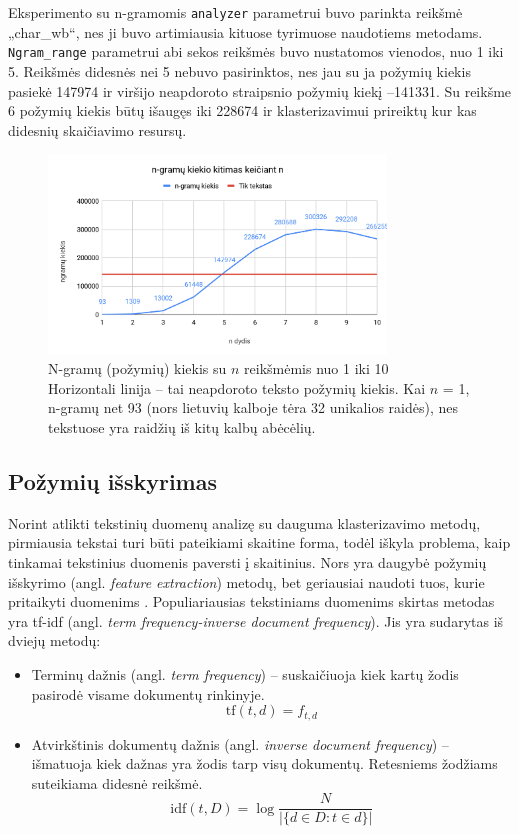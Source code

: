 \documentclass{VUMIFInfBakalaurinis}
\begin{document}
Eksperimento su n-gramomis \texttt{analyzer} parametrui buvo parinkta
reikšmė „char\_wb“, nes ji buvo artimiausia kituose tyrimuose
naudotiems metodams. \texttt{Ngram\_range} parametrui abi sekos reikšmės
buvo nustatomos vienodos, nuo 1 iki 5. Reikšmės didesnės nei 5 nebuvo
pasirinktos, nes jau su ja požymių kiekis pasiekė 147974 ir viršijo
neapdoroto straipsnio požymių kiekį --141331. Su reikšme 6 požymių
kiekis būtų išaugęs iki 228674 ir klasterizavimui prireiktų kur kas
didesnių skaičiavimo resursų.

\begin{figure}[H]
	\centering
	\includegraphics[width=0.8\textwidth]{./img/image7.png}
	\caption{N-gramų (požymių) kiekis su $n$ reikšmėmis nuo 1 iki 10\\
  Horizontali linija -- tai neapdoroto teksto požymių kiekis. Kai $n$
  = 1, n-gramų net 93 (nors lietuvių kalboje tėra 32 unikalios raidės),
  nes tekstuose yra raidžių iš kitų kalbų abėcėlių.}
  \label{nsize}
\end{figure}

\subsection{Požymių išskyrimas}\label{tfidf}

Norint atlikti tekstinių duomenų analizę su dauguma klasterizavimo
metodų, pirmiausia tekstai turi būti pateikiami skaitine forma, todėl
iškyla problema, kaip tinkamai tekstinius duomenis paversti į
skaitinius. Nors yra daugybė požymių išskyrimo (angl. \emph{feature
extraction}) metodų, bet geriausiai naudoti tuos, kurie pritaikyti
duomenims \cite{alelyani2013feature}. Populiariausias tekstiniams duomenims skirtas
metodas yra tf-idf (angl. \emph{term frequency-inverse document
frequency}). Jis yra sudarytas iš dviejų metodų:

\begin{itemize}
\item
  Terminų dažnis (angl. \emph{term frequency}) -- suskaičiuoja kiek
  kartų žodis pasirodė visame dokumentų rinkinyje.
  $$\mathrm{tf} (t,d)=f_{t,d}$$
\item
  Atvirkštinis dokumentų dažnis (angl. \emph{inverse document
  frequency}) -- išmatuoja kiek dažnas yra žodis tarp visų dokumentų.
  Retesniems žodžiams suteikiama didesnė reikšmė.
  $$\mathrm{idf}(t, D) =  \log \frac{N}{|\{d \in D: t \in d\}|}$$
\end{itemize}
\end{document}
